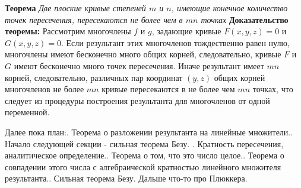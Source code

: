 \documentclass[a4paper, 12pt]{article}
\begin{document}
\bigskip
\textbf{Теорема}
\textit{Две плоские кривые степеней $m$ и $n$, имеющие конечное количество точек пересечения, пересекаются не более чем в $mn$ точках}\newline
\smallskip
\textbf{Доказательство теоремы:}\newline
Рассмотрим многочлены $f$ и $g$, задающие кривые $F(x,y,z) = 0$ и $G(x,y,z) = 0$. Если результант этих многочленов тождественно равен нулю, многочлены имеют бесконечно много общих корней, следовательно, кривые $F$ и $G$ имеют бесконечно много точек пересечения. Иначе результант имеет $mn$ корней, следовательно, различных пар координат $(y,z)$ общих корней многочленов не более $mn$ кривые пересекаются в не более чем $mn$ точках, что следует из процедуры построения результанта для многочленов от одной переменной.

\bigskip
Далее пока план:. Теорема о разложении результанта на линейные множители.. Начало следующей секции - сильная теорема Безу. . Кратность пересечения, аналитическое определение.. Теорема о том, что это число целое.. Теорема о совпадении этого числа с алгебраической кратностью линейного множителя результанта.. Сильная теорема Безу. Дальше что-то про Плюккера.\newline
\end{document}
